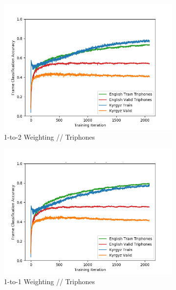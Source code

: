\documentclass[a4paper]{article}
\begin{document}
\begin{figure}[!htbp]
\begin{subfigure}{.33\textwidth}
  \centering
  \includegraphics[width=1\textwidth,keepaspectratio]{figs-1/2-to-1-tri.png}
  \caption{1-to-2 Weighting // Triphones}
  \label{fig:sub1}
\end{subfigure}%
\begin{subfigure}{.33\textwidth}
  \centering
  \includegraphics[width=1\textwidth,keepaspectratio]{figs-1/1-to-1-tri.png}
  \caption{1-to-1 Weighting // Triphones}
  \label{fig:sub2}
\end{subfigure}%
\begin{subfigure}{.33\textwidth}
  \centering

\end{subfigure}
\end{figure}
\end{document}
